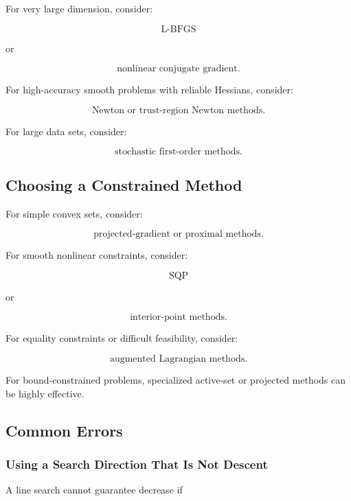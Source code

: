 For very large dimension, consider:

\[
\boxed{
\text{L-BFGS}
}
\]

or

\[
\boxed{
\text{nonlinear conjugate gradient}.
}
\]

For high-accuracy smooth problems with reliable Hessians, consider:

\[
\boxed{
\text{Newton or trust-region Newton methods}.
}
\]

For large data sets, consider:

\[
\boxed{
\text{stochastic first-order methods}.
}
\]

\subsection{Choosing a Constrained Method}
\label{subsec:choosing-constrained-method}

For simple convex sets, consider:

\[
\boxed{
\text{projected-gradient or proximal methods}.
}
\]

For smooth nonlinear constraints, consider:

\[
\boxed{
\text{SQP}
}
\]

or

\[
\boxed{
\text{interior-point methods}.
}
\]

For equality constraints or difficult feasibility, consider:

\[
\boxed{
\text{augmented Lagrangian methods}.
}
\]

For bound-constrained problems, specialized active-set or projected methods
can be highly effective.

\subsection{Common Errors}
\label{subsec:numerical-optimization-common-errors}

\subsubsection{Using a Search Direction That Is Not Descent}

A line search cannot guarantee decrease if

